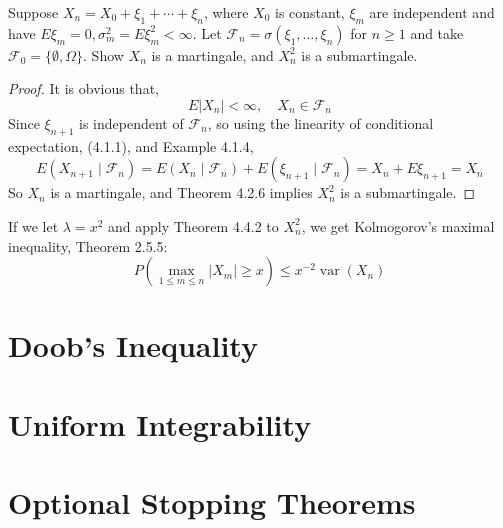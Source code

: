 \begin{example}
    Suppose $X_{n}=X_{0}+\xi_{1}+\cdots+\xi_{n}$, where $X_{0}$ is constant, $\xi_{m}$ are independent and have $E\xi_{m}=0,\sigma_{m}^{2}=E\xi_{m}^{2}<\infty$. Let $\mathcal{F}_{n}=\sigma\left(\xi_{1},\ldots,\xi_{n}\right)$ for $n\geq 1$ and take $\mathcal{F}_{0}=\{\emptyset, \Omega\}$. Show $X_{n}$ is a martingale, and $X_{n}^{2}$ is a submartingale.
\end{example}

\begin{proof}
    It is obvious that,
    \begin{equation*}
        E\left|X_{n}\right|<\infty,\quad X_{n}\in\mathcal{F}_{n}
    \end{equation*}
    Since $\xi_{n+1}$ is independent of $\mathcal{F}_{n}$, so using the linearity of conditional expectation, (4.1.1), and Example 4.1.4,
    \begin{equation*}
        E\left(X_{n+1}\mid\mathcal{F}_{n}\right)=E\left(X_{n}\mid\mathcal{F}_{n}\right)+E\left(\xi_{n+1}\mid\mathcal{F}_{n}\right)=X_{n}+E\xi_{n+1}=X_{n}
    \end{equation*}
    So $X_{n}$ is a martingale, and Theorem 4.2.6 implies $X_{n}^{2}$ is a submartingale.
\end{proof}

\begin{note}
    If we let $\lambda=x^{2}$ and apply Theorem 4.4.2 to $X_{n}^{2}$, we get Kolmogorov's maximal inequality, Theorem 2.5.5:
    \begin{equation}
        P\left(\max_{1\leq m\leq n}\left|X_{m}\right|\geq x\right)\leq x^{-2}\operatorname{var}\left(X_{n}\right)
    \end{equation}
\end{note}

\section{Doob's Inequality}

\begin{theorem}

\end{theorem}

\begin{theorem}

\end{theorem}

\begin{theorem}

\end{theorem}

\section{Uniform Integrability}

\section{Optional Stopping Theorems}
